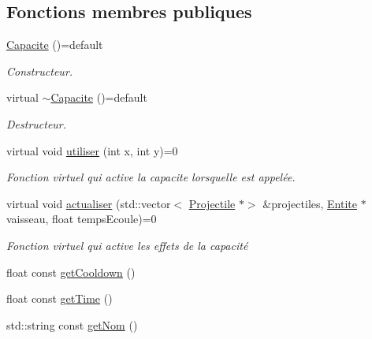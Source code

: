\subsection*{Fonctions membres publiques}
\begin{DoxyCompactItemize}
\item 
\hyperlink{class_capacite_a8a1aebc5b2332e366a3f207c23b4d363}{Capacite} ()=default
\begin{DoxyCompactList}\small\item\em Constructeur. \end{DoxyCompactList}\item 
virtual \hyperlink{class_capacite_a43be1570a24a64682ff3f034330779a9}{$\sim$\+Capacite} ()=default
\begin{DoxyCompactList}\small\item\em Destructeur. \end{DoxyCompactList}\item 
virtual void \hyperlink{class_capacite_a6f5e6efda11f80ab8538e23f5bdc6e79}{utiliser} (int x, int y)=0
\begin{DoxyCompactList}\small\item\em Fonction virtuel qui active la capacite lorsqu\textquotesingle{}elle est appelée. \end{DoxyCompactList}\item 
virtual void \hyperlink{class_capacite_a924214972f385ef409031bafc0f315b7}{actualiser} (std\+::vector$<$ \hyperlink{class_projectile}{Projectile} $\ast$$>$ \&projectiles, \hyperlink{class_entite}{Entite} $\ast$vaisseau, float temps\+Ecoule)=0
\begin{DoxyCompactList}\small\item\em Fonction virtuel qui active les effets de la capacité \end{DoxyCompactList}\item 
float const \hyperlink{class_capacite_af07c1c3a2c9259a7eab270b3d8f867de}{get\+Cooldown} ()
\item 
float const \hyperlink{class_capacite_a963dd214cc53c76358b5326d9164884f}{get\+Time} ()
\item 
std\+::string const \hyperlink{class_capacite_a96218b289768ff461ffaaa0abe014a42}{get\+Nom} ()
\end{DoxyCompactItemize}
